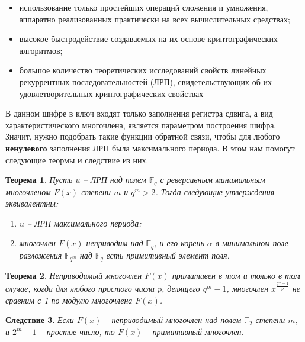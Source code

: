 \documentclass[a4paper,12pt]{article}
\newtheorem{theorem}{Теорема}[section]
\newtheorem{corollary}[theorem]{Следствие}
\theoremstyle{definition}
\begin{document}
	\begin{itemize}[topsep=0pt, itemsep=0pt, parsep=0pt]
		\item использование только простейших операций сложения и умножения, аппаратно реализованных практически на всех вычислительных средствах;
		\item высокое быстродействие создаваемых на их основе криптографических алгоритмов;
		\item большое количество теоретических исследований свойств линейных рекуррентных последовательностей (ЛРП), свидетельствующих об их удовлетворительных криптографических свойствах
	\end{itemize}

	В данном шифре в ключ входят только заполнения регистра сдвига, а вид характеристического многочлена, является параметром построения шифра. Значит, нужно подобрать такие функции обратной связи, чтобы для любого \textbf{ненулевого} заполнения ЛРП была максимального периода. В этом нам помогут следующие теормы и следствие из них.
	
	\begin{theorem}
		Пусть $u$ – ЛРП над полем $\mathbb{F}_q$ с реверсивным минимальным многочленом $F(x)$ степени $m$ и $q^m > 2$. Тогда следующие утверждения эквивалентны:
		\begin{enumerate}[topsep=0pt, itemsep=0pt, parsep=0pt, label=(\arabic*)]
			\item $u$ – ЛРП максимального периода;
			\item многочлен $F(x)$ неприводим над $\mathbb{F}_q$, и его корень $\alpha$ в минимальном поле разложения $\mathbb{F}_{q^m}$ над $\mathbb{F}_q$ есть примитивный элемент поля.
		\end{enumerate}
	\end{theorem}

	\begin{theorem}
		Неприводимый многочлен $F(x)$ примитивен в том и только в том случае, когда для любого простого числа $p$, делящего $q^m - 1$, 
		многочлен $x^{\frac{q^m - 1}{p}}$ не сравним с 1 по модулю многочлена $F(x)$.

	\end{theorem}
	
	\begin{corollary}
		Если $F(x)$ -- неприводимый многочлен над полем $\mathbb{F}_2$ степени $m$, и $2^m - 1$ -- простое число, то $F(x)$ -- примитивный многочлен.

	\end{corollary}
\end{document}
